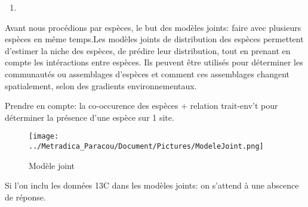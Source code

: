 \documentclass[
]{book}
\providecommand{\tightlist}{%
  \setlength{\itemsep}{0pt}\setlength{\parskip}{0pt}}
\begin{document}
\begin{enumerate}
\def\labelenumi{(\arabic{enumi})}
\setcounter{enumi}{1}
\tightlist
\item
\end{enumerate}

Avant nous procédions par espèces, le but des modèles joints: faire avec plusieurs espèces en même temps.Les modèles joints de distribution des espèces permettent d'estimer la niche des espèces, de prédire leur distribution, tout en prenant en compte les intéractions entre espèces. Ils peuvent être utilisés pour déterminer les communautés ou assemblages d'espèces et comment ces assemblages changent spatialement, selon des gradients environnementaux.

Prendre en compte: la co-occurence des espèces + relation trait-env't pour déterminer la présence d'une espèce sur 1 site.

\begin{figure}
\centering
\texttt{[image: ../Metradica\_Paracou/Document/Pictures/ModeleJoint.png]}
\caption{Modèle joint}
\end{figure}

Si l'on inclu les données 13C dans les modèles joints: on s'attend à une abscence de réponse.

  
\end{document}
